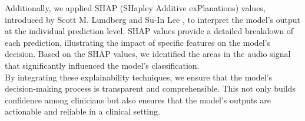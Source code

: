 Additionally, we applied SHAP (SHapley Additive exPlanations) values, introduced by Scott M. Lundberg and
Su{-}In Lee \cite{DBLP:journals/corr/LundbergL17}, to interpret the model's output at the individual prediction level.
SHAP values provide a detailed breakdown of each prediction, illustrating the impact of specific features on the model's decision.
Based on the SHAP values, we identified the areas in the audio signal that significantly influenced the model's classification.\\
By integrating these explainability techniques, we ensure that the model’s decision-making process is transparent and comprehensible.
This not only builds confidence among clinicians but also ensures that the model's outputs are actionable and reliable in a clinical setting.